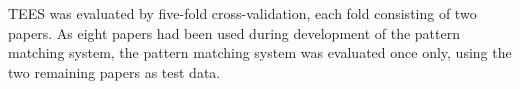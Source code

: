 
TEES was evaluated by five-fold cross-validation, each fold consisting of two papers. As eight papers had been used during development of the pattern matching system, the pattern matching system was evaluated once only, using the two remaining papers as test data.
